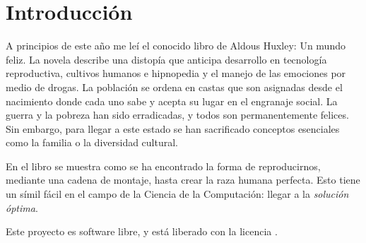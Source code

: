\chapter{Introducción}

A principios de este año me leí el conocido libro de Aldous Huxley: Un mundo feliz. La novela describe una
distopía que anticipa desarrollo en tecnología reproductiva, cultivos humanos  e hipnopedia y el manejo de las
emociones por medio de drogas. La población se ordena en castas que son asignadas desde el nacimiento donde cada uno
sabe y acepta su lugar en el engranaje social. La guerra y la pobreza han sido erradicadas, y todos son permanentemente
felices. Sin embargo, para llegar a este estado se han sacrificado conceptos esenciales como la familia o la diversidad
cultural.

En el libro se muestra como se ha encontrado la forma de reproducirnos, mediante una cadena de montaje,
hasta crear la raza humana perfecta. Esto tiene un símil fácil en el campo de la Ciencia de la Computación: llegar
a la \textit{solución óptima}.

Este proyecto es software libre, y está liberado con la licencia \cite{gplv3}.
